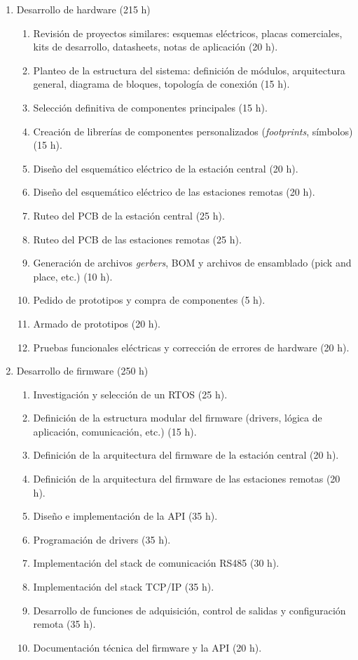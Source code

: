 \documentclass[
11pt, %
]{charter}
\begin{document}
\begin{enumerate}
	\item Desarrollo de hardware (215 h)
	\begin{enumerate}
		\item Revisión de proyectos similares: esquemas eléctricos, placas comerciales, kits de desarrollo, datasheets, notas de aplicación (20 h).
		\item Planteo de la estructura del sistema: definición de módulos, arquitectura general, diagrama de bloques, topología de conexión (15 h).
		\item Selección definitiva de componentes principales (15 h).
		\item Creación de librerías de componentes personalizados (\textit{footprints}, símbolos) (15 h).
		\item Diseño del esquemático eléctrico de la estación central (20 h).
		\item Diseño del esquemático eléctrico de las estaciones remotas (20 h).
		\item Ruteo del PCB de la estación central (25 h).
		\item Ruteo del PCB de las estaciones remotas (25 h).
		\item Generación de archivos \textit{gerbers}, BOM y archivos de ensamblado (pick and place, etc.) (10 h).
		\item Pedido de prototipos y compra de componentes (5 h).
		\item Armado de prototipos (20 h).
		\item Pruebas funcionales eléctricas y corrección de errores de hardware (20 h).
	\end{enumerate}
	\newpage
	\item Desarrollo de firmware (250 h)
	\begin{enumerate}
		\item Investigación y selección de un RTOS (25 h).
		\item Definición de la estructura modular del firmware (drivers, lógica de aplicación, comunicación, etc.) (15 h).
		\item Definición de la arquitectura del firmware de la estación central (20 h).
		\item Definición de la arquitectura del firmware de las estaciones remotas (20 h).
		\item Diseño e implementación de la API (35 h).
		\item Programación de drivers (35 h).
		\item Implementación del stack de comunicación RS485 (30 h).
		\item Implementación del stack TCP/IP (35 h).
		\item Desarrollo de funciones de adquisición, control de salidas y configuración remota (35 h).
		\item Documentación técnica del firmware y la API (20 h).
	\end{enumerate}
	

\end{enumerate}
\end{document}
